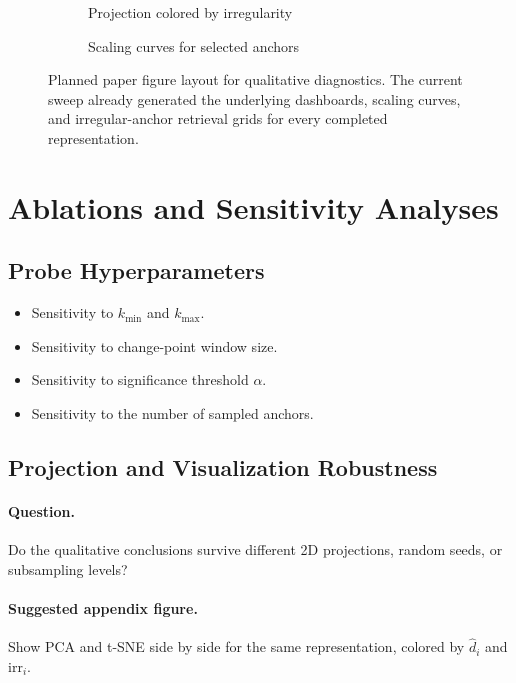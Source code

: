 \documentclass{article}
\newcommand{\dimhat}{\widehat{d}}
\newcommand{\irr}{\mathrm{irr}}
\theoremstyle{definition}
\theoremstyle{plain}
\theoremstyle{remark}
\begin{document}
\begin{figure}[H]
\centering
\begin{subfigure}[t]{0.48\linewidth}
  \centering
  \fbox{\rule{0pt}{1.8in}\rule{0.95\linewidth}{0pt}}
  \caption{Projection colored by irregularity}
\end{subfigure}
\hfill
\begin{subfigure}[t]{0.48\linewidth}
  \centering
  \fbox{\rule{0pt}{1.8in}\rule{0.95\linewidth}{0pt}}
  \caption{Scaling curves for selected anchors}
\end{subfigure}
\caption{Planned paper figure layout for qualitative diagnostics. The current sweep already generated the underlying dashboards, scaling curves, and irregular-anchor retrieval grids for every completed representation.}
\label{fig:qualitative}
\end{figure}

\section{Ablations and Sensitivity Analyses}
\label{sec:ablations}

\subsection{Probe Hyperparameters}
\begin{itemize}[leftmargin=1.5em]
\item Sensitivity to $k_{\min}$ and $k_{\max}$.
\item Sensitivity to change-point window size.
\item Sensitivity to significance threshold $\alpha$.
\item Sensitivity to the number of sampled anchors.
\end{itemize}

\subsection{Projection and Visualization Robustness}
\paragraph{Question.}
Do the qualitative conclusions survive different 2D projections, random seeds, or subsampling levels?

\paragraph{Suggested appendix figure.}
Show PCA and t-SNE side by side for the same representation, colored by $\dimhat_i$ and $\irr_i$.
\end{document}
